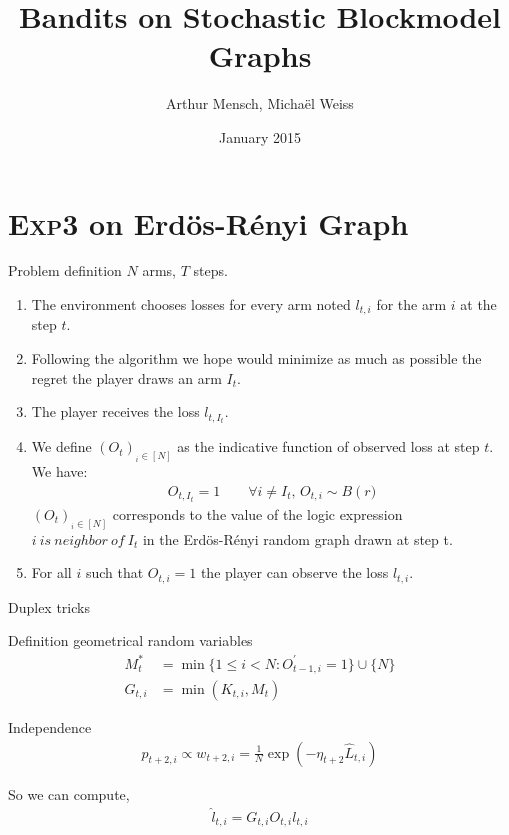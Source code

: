 \documentclass[11pt]{beamer}
\author{Arthur Mensch, Michaël Weiss}
\title{Bandits on Stochastic Blockmodel Graphs}
\institute{Reinforcement Learning}
\date{January 2015}
\begin{document}
\begin{frame}
\titlepage
\end{frame}

\section{\textsc{Exp3} on Erdös-Rényi Graph}
\begin{frame}{Problem definition}
$N$ arms, $T$ steps.
\begin{enumerate}
\item The environment chooses losses for every arm noted $l_{t,i}$ for the arm $i$ at the step $t$.
\item Following the algorithm we hope would minimize as much as possible the regret the player draws an arm $I_t$.
\item The player receives the loss $l_{t,I_t}$.
\item We define $\left(O_t\right)_{_i\in\left[N\right]}$ as the indicative function of observed loss at step $t$. We have:
\begin{align*}
O_{t,I_t}=1 \qquad \forall i \neq I_t,\, O_{t,i} \sim B\left(r\right.)
\end{align*}
$\left(O_t\right)_{_i\in\left[N\right]}$ corresponds to the value of the logic expression $ i \ is\ neighbor\ of\ I_t$ in the Erdös-Rényi random graph drawn at step t.
\item For all $i$ such that $O_{t,i}=1$ the player can observe the loss $l_{t,i}$.
\end{enumerate}
\end{frame}

\begin{frame}{Duplex tricks}
\begin{block}{Definition geometrical random variables}
\begin{align*}
M_t^* &=\min\{1\leq i<N: O_{t-1,i}^{'} =1\}\cup\{N\}\\
G_{t,i}&=\min\left(K_{t,i},M_t\right)
\end{align*}
\end{block}
\begin{block}{Independence}
\begin{align*}
p_{t+2,i}\propto w_{t+2,i}= \frac{1}{N} \exp\left( -\eta_{t+2} \hat{L}_{t,i} \right)
\end{align*}
\end{block}
So we can compute,
\begin{align*}
\hat{l}_{t,i}=G_{t,i}O_{t,i}l_{t,i}
\end{align*}
\end{frame}
\end{document}
